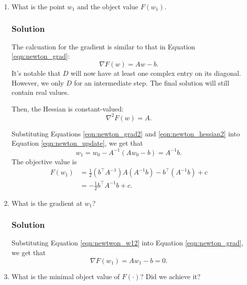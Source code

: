 \documentclass[letterpaper,11pt]{article}
\begin{document}
\begin{enumerate}
\item What is the point $w_1$ and the object value $F\left(w_1\right)$.

  \subsubsection*{Solution}

  The calcuation for the gradient is similar to that in Equation
  \ref{eqn:newton_grad}:
  \begin{equation}
    \nabla F(w) = Aw - b.
    \label{eqn:newton_grad2}
  \end{equation}
  It's notable that $D$ will now have at least one complex entry on its
  diagonal. However, we only $D$ for an intermediate step. The final solution
  will still contain real values.

  Then, the Hessian is constant-valued:
  \begin{equation}
    \nabla^2 F(w) = A.
    \label{eqn:newton_hessian2}
  \end{equation}

  Substituting Equations \ref{eqn:newton_grad2} and \ref{eqn:newton_hessian2}
  into Equation \ref{eqn:newton_update}, we get that
  \begin{equation}
    w_1 = w_0 - A^{-1}\left(Aw_0 - b\right) = \boxed{A^{-1}b.}
    \label{eqn:newtwon_w12}
  \end{equation}
  The objective value is
  \begin{align}
    F\left(w_1\right)
    &= \frac{1}{2} \left(b^\intercal A^{-1}\right)A\left(A^{-1}b\right)
      - b^\intercal \left(A^{-1}b\right) + c \nonumber\\
    &= \boxed{-\frac{1}{2}b^\intercal A^{-1}b + c.}
      \label{eqn:newton_min_object2}
  \end{align}
  
\item What is the gradient at $w_1$?
  \subsubsection*{Solution}

  Substituting Equation \ref{eqn:newtwon_w12} into Equation
  \ref{eqn:newton_grad}, we get that
  \begin{equation}
    \nabla F(w_1) = Aw_1 - b = \boxed{0.}
  \end{equation}  
\item What is the minimal object value of $F\left(\cdot\right)$? Did we achieve
  it?


\end{enumerate}
\end{document}
